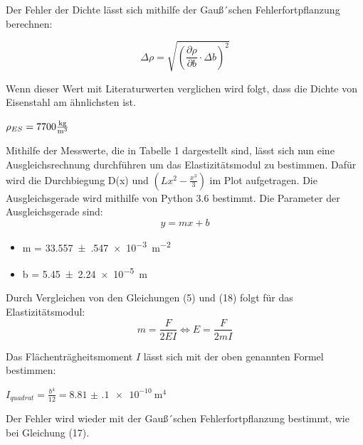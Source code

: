 Der Fehler der Dichte lässt sich mithilfe der Gauß´schen Fehlerfortpflanzung berechnen:

\begin{equation}
  \Delta \rho = \sqrt{\left(\frac{\partial\rho}{\partial b} \cdot \Delta b \right)^2}
\end{equation}

Wenn dieser Wert mit Literaturwerten verglichen wird folgt, dass die Dichte von Eisenstahl
am ähnlichsten ist.\\
\centerline{$\rho_{ES} = 7700 \si[per-mode=fraction]{\kilo\gram\per\metre\tothe{3}}$}


Mithilfe der Messwerte, die in Tabelle 1 dargestellt sind, lässt sich nun eine
Ausgleichsrechnung durchführen um das Elastizitätsmodul zu bestimmen. Dafür wird die
Durchbiegung D(x) und $\left( Lx^2- \frac{x^3}{3} \right)$ im Plot aufgetragen.
Die Ausgleichsgerade wird mithilfe von Python 3.6 bestimmt.
Die Parameter der Ausgleichsgerade sind:\\

\begin{equation}
  y=mx+b
\end{equation}

\begin{itemize}
  \item m = \SI{33.557(547)e-3}{\meter\tothe{-2}}
  \item b = \SI{5.45(224)e-5}{\meter}
\end{itemize}

Durch Vergleichen von den Gleichungen (5) und (18) folgt für das Elastizitätsmodul:\\

\begin{equation}
  m = \frac{F}{2EI} \iff E= \frac{F}{2mI}
\end{equation}

Das Flächenträgheitsmoment $I$ lässt sich mit der oben genannten Formel bestimmen:\\

\centerline{$I_{quadrat} = \frac{b^4}{12} = \SI{8.81(10)e-10}{\meter\tothe{4}}$}

Der Fehler wird wieder mit der Gauß´schen Fehlerfortpflanzung bestimmt, wie bei Gleichung (17).\\

